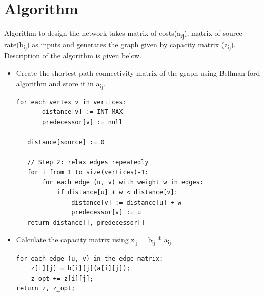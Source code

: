 \documentclass[11pt]{article}
\begin{document}
 \section{Algorithm}
Algorithm to design the network takes matrix of costs(a\textsubscript{ij}), matrix of source rate(b\textsubscript{ij}) as inputs and generates the graph given by capacity matrix (z\textsubscript{ij}). Description of the algorithm is given below.
\begin{itemize}
\item Create the shortest path connectivity matrix of the graph using Bellman ford algorithm and store it in a\textsubscript{ij}.
\begin{lstlisting}
for each vertex v in vertices:
       distance[v] := INT_MAX       
       predecessor[v] := null         
   
   distance[source] := 0 
   
   // Step 2: relax edges repeatedly
   for i from 1 to size(vertices)-1:
       for each edge (u, v) with weight w in edges:
           if distance[u] + w < distance[v]:
               distance[v] := distance[u] + w
               predecessor[v] := u
   return distance[], predecessor[]
\end{lstlisting}
\item Calculate the capacity matrix using z\textsubscript{ij} = b\textsubscript{ij} * a\textsubscript{ij}
\begin{lstlisting}
for each edge (u, v) in the edge matrix:
	z[i][j] = b[i][j](a[i][j]);
	z_opt += z[i][j];
return z, z_opt;
\end{lstlisting}
\end{itemize} 
\end{document}
